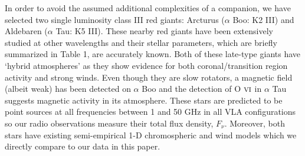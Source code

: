 \documentclass[iop]{emulateapj}
\begin{document}
In order to avoid the assumed additional complexities of a companion, we have selected two single luminosity class III red giants: Arcturus ($\alpha$ Boo: K2 III) and Aldebaren ($\alpha$ Tau: K5 III). These nearby red giants have been extensively studied at other wavelengths and their stellar parameters, which are briefly summarized in Table 1, are accurately known. Both of these late-type giants have `hybrid atmospheres' as they show evidence for both coronal/transition region activity and strong winds. Even though they are slow rotators, a magnetic field (albeit weak) has been detected on $\alpha$ Boo \citep{2011A&A...529A.100S} and the detection of O $\textsc{vi}$ in $\alpha$ Tau \citep{2005ApJ...622..629D} suggests magnetic activity in its atmosphere. These stars are predicted to be point sources at all frequencies between 1 and 50 GHz in all VLA configurations so our radio observations measure their total flux density, $F_{\nu}$. Moreover, both stars have existing semi-empirical 1-D chromospheric and wind models which we directly compare to our data in this paper.
\end{document}
